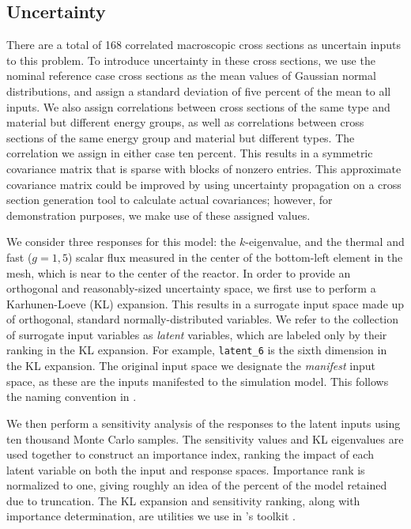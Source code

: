 \subsection{Uncertainty}
There are a total of 168 correlated macroscopic cross sections as uncertain inputs to this problem.  To
introduce uncertainty in these cross sections, we use the nominal reference case cross sections as the mean
values of Gaussian normal distributions, and assign a standard deviation of five percent of the mean to all 
inputs.  We also assign
correlations between cross sections of the same type and material but different energy groups, as well as
correlations between cross sections of the same energy group and material but different types.  The
correlation we assign in either case ten percent.  This results in a symmetric covariance matrix that is sparse with
blocks of nonzero entries.  This approximate covariance matrix could be improved by using uncertainty propagation
on a cross section generation tool to calculate actual covariances; however, for demonstration purposes, we
make use of
these assigned values.

We consider three responses for this model: the $k$-eigenvalue, and the thermal and fast ($g=1,5$) scalar 
flux measured in the center of the
bottom-left element in the mesh, which is near to the center of the reactor.  In order to provide an
orthogonal and reasonably-sized uncertainty space, we first use \raven{} \cite{raven} to perform a Karhunen-Loeve (KL) 
\cite{karhunen}
expansion.  This results in a surrogate input space made up of orthogonal, standard normally-distributed
variables.  We refer to the collection of surrogate input variables as \emph{latent} variables, which are
labeled only by their ranking in the KL expansion.  For example, \texttt{latent\_6} is the sixth dimension in
the KL expansion.  The original input space we designate the \emph{manifest} input space, as these are the
inputs manifested to the simulation model.  This follows the naming convention in \raven{}.

We then perform a sensitivity analysis of the responses to the latent inputs using ten thousand Monte Carlo samples.  
The sensitivity values and KL
eigenvalues are used together to construct an importance index, ranking the impact of each latent variable on
both the input and response spaces.  Importance rank is normalized to one, giving roughly an idea of the
percent of the model retained due to truncation.  The KL expansion and sensitivity ranking, along with importance
determination, are utilities we use in \raven{}'s toolkit \cite{physor2016}.  

